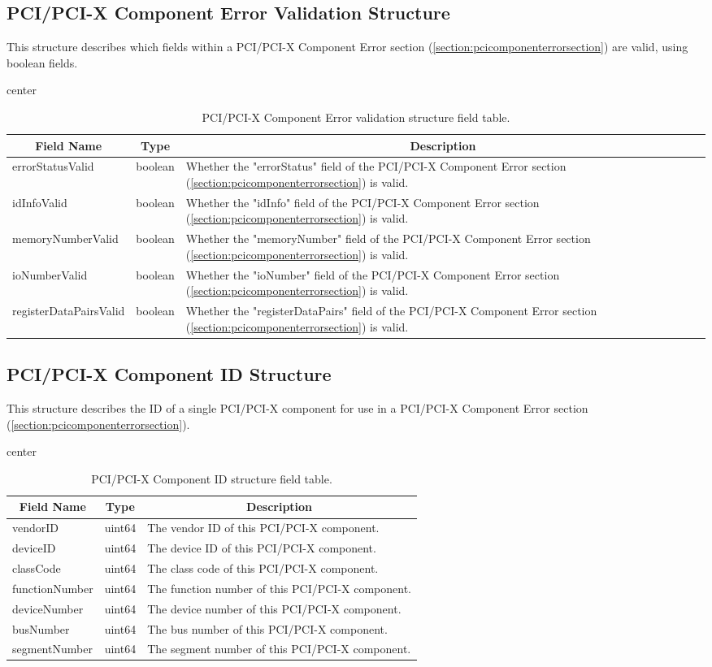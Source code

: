 \documentclass{report}
\newcommand*{\thead}[1]{\multicolumn{1}{|c|}{\bfseries #1}}
\newcommand*{\jsontable}[1]{
    \begin{table}[!ht]
    \label{#1}
    \centering
    \begin{adjustbox}{center}
    \begin{tabular}{|l|c|p{8cm}|}
    \hline
    \thead{Field Name} & \thead{Type} & \thead{Description} \\
    \hline
}
\newcommand*{\jsontableend}[1]{
    \hline
    \end{tabular}
    \end{adjustbox}
    \caption{#1}
    \label{table:#1}
    \end{table}
    \FloatBarrier
}
\begin{document}
\subsection{PCI/PCI-X Component Error Validation Structure}
\label{subsection:pcicomponenterrorvalidationstructure}
This structure describes which fields within a PCI/PCI-X Component Error section (\ref{section:pcicomponenterrorsection}) are valid, using boolean fields.
\jsontable{table:pcicomponenterrorvalidationstructure}
errorStatusValid & boolean & Whether the "errorStatus" field of the PCI/PCI-X Component Error section (\ref{section:pcicomponenterrorsection}) is valid.\\
\hline
idInfoValid & boolean & Whether the "idInfo" field of the PCI/PCI-X Component Error section (\ref{section:pcicomponenterrorsection}) is valid.\\
\hline
memoryNumberValid & boolean & Whether the "memoryNumber" field of the PCI/PCI-X Component Error section (\ref{section:pcicomponenterrorsection}) is valid.\\
\hline
ioNumberValid & boolean & Whether the "ioNumber" field of the PCI/PCI-X Component Error section (\ref{section:pcicomponenterrorsection}) is valid.\\
\hline
registerDataPairsValid & boolean & Whether the "registerDataPairs" field of the PCI/PCI-X Component Error section (\ref{section:pcicomponenterrorsection}) is valid.\\
\jsontableend{PCI/PCI-X Component Error validation structure field table.}

\subsection{PCI/PCI-X Component ID Structure}
\label{subsection:pcicomponentidstructure}
This structure describes the ID of a single PCI/PCI-X component for use in a PCI/PCI-X Component Error section (\ref{section:pcicomponenterrorsection}).
\jsontable{table:pcicomponentidstructure}
vendorID & uint64 & The vendor ID of this PCI/PCI-X component.\\
\hline
deviceID & uint64 & The device ID of this PCI/PCI-X component.\\
\hline
classCode & uint64 & The class code of this PCI/PCI-X component.\\
\hline
functionNumber & uint64 & The function number of this PCI/PCI-X component.\\
\hline
deviceNumber & uint64 & The device number of this PCI/PCI-X component.\\
\hline
busNumber & uint64 & The bus number of this PCI/PCI-X component.\\
\hline
segmentNumber & uint64 & The segment number of this PCI/PCI-X component.\\
\jsontableend{PCI/PCI-X Component ID structure field table.}
\end{document}
